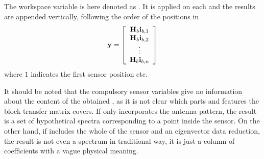 The workspace variable  is here denoted as
. It is applied on each  and the results are
appended vertically, following the order of the positions in
\begin{equation}
  \mathbf{y} = \left[ \begin{array}{c} \mathbf{H}_{b}\mathbf{i}_{{b,1}} \\ 
                                    \mathbf{H}_{b}\mathbf{i}_{{b,2}} \\
                                    \vdots                     \\
                                    \mathbf{H}_{b}\mathbf{i}_{{b,n}} 
            \end{array} \right]
  \label{eq:fm_defs:measseq}
\end{equation}
where $1$ indicates the first sensor position etc. 

It should be noted that the compulsory sensor variables give no
information about the content of the obtained \MsrVct, as it is not
clear which parts and features the block transfer matrix covers. If
 only incorporates the antenna pattern, the result is a set
of hypothetical spectra corresponding to a point inside the sensor. On
the other hand, if  includes the whole of the sensor and an
eigenvector data reduction, the result is not even a spectrum in
traditional way, it is just a column of coefficients with a vague
physical meaning.


